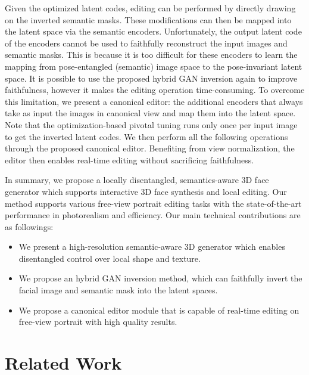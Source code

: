 \documentclass[acmtog]{acmart}
\begin{document}
Given the optimized latent codes, editing can be performed by directly drawing on the inverted semantic masks. These modifications can then be mapped into the latent space via the semantic encoders. Unfortunately, the output latent code of the encoders cannot be used to faithfully reconstruct the input images and semantic masks. This is because it is too difficult for these encoders to learn the mapping from pose-entangled (semantic) image space to the pose-invariant latent space.
It is possible to use the proposed hybrid GAN inversion again to improve faithfulness, however it makes the editing operation time-consuming. To overcome this limitation, we present a canonical editor: the additional encoders that always take as input the images in canonical view and map them into the latent space. Note that the optimization-based pivotal tuning runs only once per input image to get the inverted latent codes. We then perform all the following operations through the proposed canonical editor. Benefiting from view normalization, the editor then enables real-time editing without sacrificing faithfulness. 













In summary, we propose a locally disentangled, semantics-aware 3D face generator which supports interactive 3D face synthesis and local editing.
Our method supports various free-view portrait editing tasks with the state-of-the-art performance in photorealism and efficiency.
Our main technical contributions are as followings:
\begin{itemize}
    \item We present a high-resolution semantic-aware 3D generator which enables disentangled control over local shape and texture.
    
    \item We propose an hybrid GAN inversion method, which can faithfully invert the facial image and semantic mask into the latent spaces.
    
    \item We propose a canonical editor module that is capable of real-time editing on free-view portrait with high quality results. 
\end{itemize}


\section{Related Work}
\end{document}
